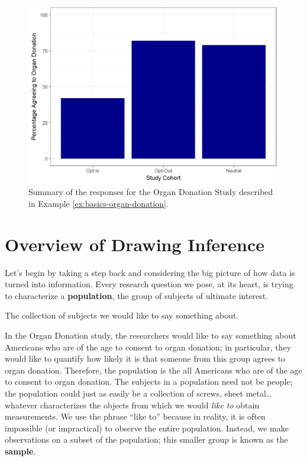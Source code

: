 \documentclass[]{book}
\theoremstyle{definition}
\theoremstyle{definition}
\theoremstyle{definition}
\theoremstyle{remark}
\let\BeginKnitrBlock\begin \let\EndKnitrBlock\end
\begin{document}
\begin{figure}

{\centering \includegraphics[width=0.8\linewidth]{./Images/basics-organ-plot-1} 

}

\caption{Summary of the responses for the Organ
Donation Study described in Example \ref{ex:basics-organ-donation}.}\label{fig:basics-organ-plot}
\end{figure}

\section{Overview of Drawing
Inference}\label{overview-of-drawing-inference}

Let's begin by taking a step back and considering the big picture of how
data is turned into information. Every research question we pose, at its
heart, is trying to characterize a \textbf{population}, the group of
subjects of ultimate interest.

\BeginKnitrBlock{definition}[Population]
\protect\hypertarget{def:defn-population}{}{\label{def:defn-population}
{} }The collection of subjects we would like to
say something about.
\EndKnitrBlock{definition}

In the Organ Donation study, the researchers would like to say something
about Americans who are of the age to consent to organ donation; in
particular, they would like to quantify how likely it is that someone
from this group agrees to organ donation. Therefore, the population is
the all Americans who are of the age to consent to organ donation. The
subjects in a population need not be people; the population could just
as easily be a collection of screws, sheet metal\ldots{}whatever
characterizes the objects from which we would \emph{like to} obtain
measurements. We use the phrase ``like to'' because in reality, it is
often impossible (or impractical) to observe the entire population.
Instead, we make observations on a subset of the population; this
smaller group is known as the \textbf{sample}.
\end{document}

